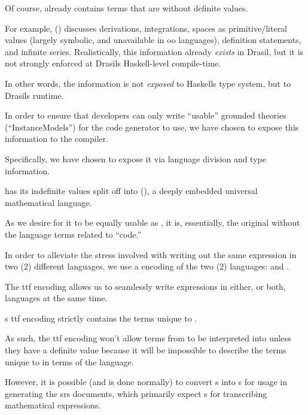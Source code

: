 Of course, \Expr{} already contains terms that are without definite values.

For example, \Expr{} () discusses derivations,
integrations, spaces as primitive/literal values (largely symbolic, and
unavailable in \acs{oo} languages), definition statements, and infinite series.
Realistically, this information already \textit{exists} in Drasil, but it is not
strongly enforced at Drasils Haskell-level compile-time.

In other words, the information is not \textit{exposed} to Haskells type system,
but to Drasils runtime.











In order to ensure that developers can only write ``usable'' grounded theories
(``InstanceModels'') for the code generator to use, we have chosen to expose
this information to the compiler.

Specifically, we have chosen to expose it via language division and type
information.

\languageDivision{}

\Expr{} has its indefinite values split off into \ModelExpr{}
(), a deeply embedded universal mathematical
language.

As we desire for it to be equally usable as \Expr{}, it is, essentially, the
original \Expr{} without the language terms related to ``code.''

In order to alleviate the stress involved with writing out the same expression
in two (2) different languages, we use a  encoding of the two (2)
languages:  and . 

The \acs{ttf} encoding allows us to seamlessly write expressions in either, or
both, languages at the same time. 

\ModelExpr{}s \acs{ttf} encoding strictly contains the terms unique to
\ModelExpr{}.

As such, the \acs{ttf} encoding won't allow terms from \ModelExpr{} to be
interpreted into \Expr{} unless they have a definite value because it will be
impossible to describe the terms unique to \ModelExpr{} in terms of the \Expr{}
language.

However, it is possible (and is done normally) to convert \Expr{}s into
\ModelExpr{}s for usage in generating the \acs{srs} documents, which primarily
expect \ModelExpr{}s for transcribing mathematical expressions.

